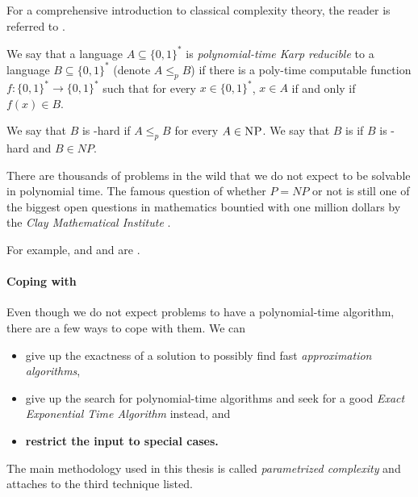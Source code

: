 For a comprehensive introduction to classical complexity theory, the reader is referred to \cite{Arora2006}.

\begin{definition}
We say that a language $A\subseteq \{0,1\}^*$ is \textit{polynomial-time Karp reducible} to a language $B \subseteq \{0,1\}^*$ (denote $A \leq_p B$) if there is a poly-time computable function $f: \{0,1\}^* \rightarrow \{0,1\}^*$ such that for every $x \in \{0,1\}^*$, $x \in A$ if and only if $f(x) \in B$.

We say that $B$ is \NP-hard if $A \leq_p B$ for every $A \in \textsc{NP}$. 
We say that $B$ is \NPc if $B$ is \NP-hard and $B \in NP$.
\end{definition}

There are thousands of \NPc problems in the wild that we do not expect to be solvable in polynomial time.
The famous question of whether $P = NP$ or not is still one of the biggest open questions in mathematics bountied with one million dollars by the \textit{Clay Mathematical Institute} \cite{Fortnow2021}.

For example, \dom and \sdom and \tdom are \NPc.

\paragraph{Coping with \NPcn}

Even though we do not expect \NPc problems to have a polynomial-time algorithm, there are a few ways to cope with them. We can 

\begin{itemize}
    \item give up the exactness of a solution to possibly find fast \textit{approximation algorithms},
    \item give up the search for polynomial-time algorithms and seek for a good \textit{Exact Exponential Time Algorithm} instead, and 
    \item\textbf{restrict the input to special cases.}
\end{itemize}

The main methodology used in this thesis is called \textit{parametrized complexity} and attaches to the third technique listed.





